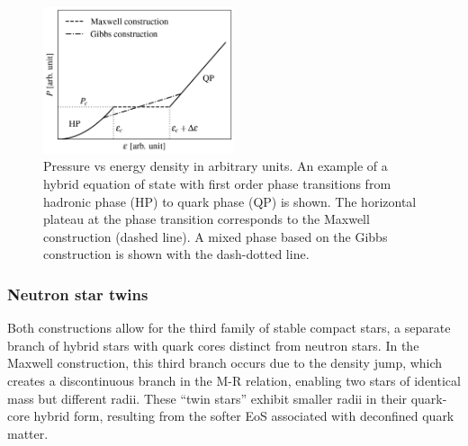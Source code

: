 \documentclass[main.tex]{subfiles}
\begin{document}


    \begin{figure}
        \centering
        \includegraphics[width=0.5\textwidth]{figures/chapter1/p_vs_epsilon.png}
        \caption{Pressure vs energy density in arbitrary units. An example of a hybrid equation of state with first order phase transitions from hadronic phase (HP) to quark phase (QP) is shown. The horizontal plateau at the phase transition corresponds to the Maxwell construction (dashed line). A mixed phase based on the Gibbs construction is shown with the dash-dotted line.}
        \label{fig:p_vs_epsilon}
    \end{figure}

    \subsubsection{Neutron star twins}
    Both constructions allow for the third family of stable compact stars, a separate branch of hybrid stars with quark cores distinct from neutron stars. In the Maxwell construction, this third branch occurs due to the density jump, which creates a discontinuous branch in the M-R relation, enabling two stars of identical mass but different radii. These ``twin stars'' exhibit smaller radii in their quark-core hybrid form, resulting from the softer EoS associated with deconfined quark matter.
    
\end{document}
